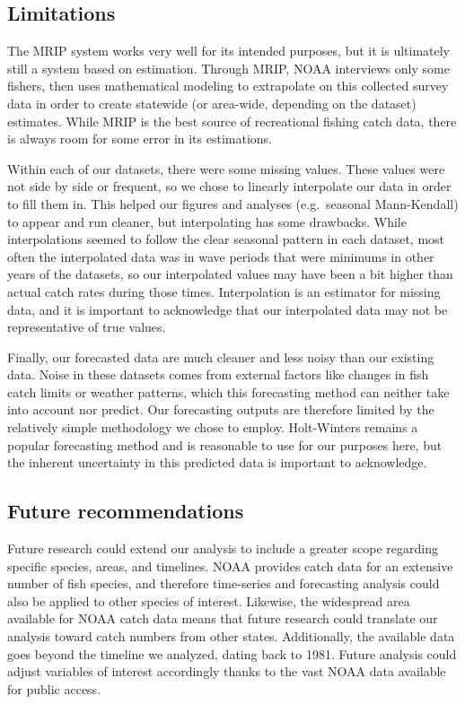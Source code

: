 \documentclass[
  12pt,
]{article}
\begin{document}
\hypertarget{limitations}{%
\subsection{Limitations}\label{limitations}}

The MRIP system works very well for its intended purposes, but it is
ultimately still a system based on estimation. Through MRIP, NOAA
interviews only some fishers, then uses mathematical modeling to
extrapolate on this collected survey data in order to create statewide
(or area-wide, depending on the dataset) estimates. While MRIP is the
best source of recreational fishing catch data, there is always room for
some error in its estimations.

Within each of our datasets, there were some missing values. These
values were not side by side or frequent, so we chose to linearly
interpolate our data in order to fill them in. This helped our figures
and analyses (e.g.~seasonal Mann-Kendall) to appear and run cleaner, but
interpolating has some drawbacks. While interpolations seemed to follow
the clear seasonal pattern in each dataset, most often the interpolated
data was in wave periods that were minimums in other years of the
datasets, so our interpolated values may have been a bit higher than
actual catch rates during those times. Interpolation is an estimator for
missing data, and it is important to acknowledge that our interpolated
data may not be representative of true values.

Finally, our forecasted data are much cleaner and less noisy than our
existing data. Noise in these datasets comes from external factors like
changes in fish catch limits or weather patterns, which this forecasting
method can neither take into account nor predict. Our forecasting
outputs are therefore limited by the relatively simple methodology we
chose to employ. Holt-Winters remains a popular forecasting method and
is reasonable to use for our purposes here, but the inherent uncertainty
in this predicted data is important to acknowledge.

\hypertarget{future-recommendations}{%
\subsection{Future recommendations}\label{future-recommendations}}

Future research could extend our analysis to include a greater scope
regarding specific species, areas, and timelines. NOAA provides catch
data for an extensive number of fish species, and therefore time-series
and forecasting analysis could also be applied to other species of
interest. Likewise, the widespread area available for NOAA catch data
means that future research could translate our analysis toward catch
numbers from other states. Additionally, the available data goes beyond
the timeline we analyzed, dating back to 1981. Future analysis could
adjust variables of interest accordingly thanks to the vast NOAA data
available for public access.
\end{document}

